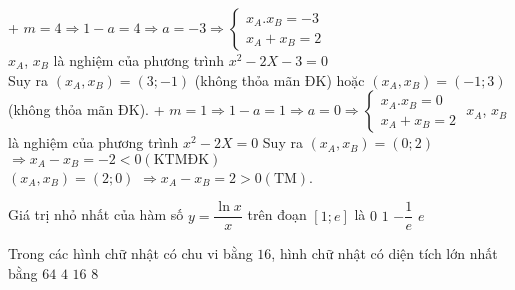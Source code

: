 \begin{ex}
{		+  $m = 4 \Rightarrow 1 - a = 4 \Rightarrow a =  - 3 \Rightarrow \left\{ \begin{array}{l}x_A.x_B =  - 3\\x_A + x_B = 2\end{array} \right.$ \\ 
		$x_A$,  $x_B$  là nghiệm của phương trình  $x^2 - 2X - 3 = 0$  \\
		Suy ra  $\left(x_A,x_B \right) = \left(3; -1\right)$ (không thỏa mãn ĐK) hoặc  $\left(x_A,x_B \right) = \left(-1;3\right)$ (không thỏa mãn ĐK).
		+  $m = 1 \Rightarrow 1 - a = 1 \Rightarrow a = 0 \Rightarrow \left\{ \begin{array}{l}x_A.x_B = 0\\x_A + x_B = 2\end{array} \right.$ 
		$x_A$,  $x_B$  là nghiệm của phương trình  $x^2 - 2X = 0$ 
		Suy ra  $\left(x_A,x_B\right) = \left( 0;2 \right)$  $\Rightarrow x_A - x_B =  - 2 < 0\left( \text{KTMĐK} \right)$  \\
		$\left(x_A,x_B\right) = \left(2;0 \right)$ $\Rightarrow x_A - x_B = 2 > 0\left( \text{TM} \right)$.}
\end{ex}

\begin{ex}%
	Giá trị nhỏ nhất của hàm số $y = \dfrac{\ln x}{x}$  trên đoạn $\left[ 1;e \right]$  là
	\choice
	{\True $0$}
	{$1$}
	{$ -\dfrac{1}{e}$}
	{$e$}
\end{ex}

\begin{ex}%
	Trong các hình chữ nhật có chu vi bằng $16$, hình chữ nhật có diện tích lớn nhất bằng
	\choice
	{$64$}
	{$4$}
	{\True $16$}
	{$8$}
\end{ex}

